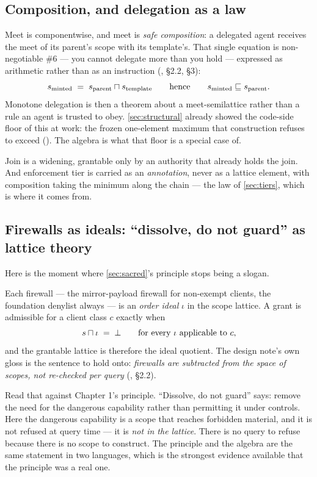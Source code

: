 \subsection*{Composition, and delegation as a law}

Meet is componentwise, and meet is \emph{safe composition}: a delegated agent
receives the meet of its parent's scope with its template's. That single equation is
non-negotiable \#6 --- you cannot delegate more than you hold --- expressed as
arithmetic rather than as an instruction
(, \S 2.2, \S 3):
\[
  s{}_{\text{minted}} \;=\; s{}_{\text{parent}} \sqcap{}
  s{}_{\text{template}}
  \qquad\text{hence}\qquad
  s{}_{\text{minted}} \sqsubseteq{} s{}_{\text{parent}}.
\]
Monotone delegation is then a theorem about a meet-semilattice rather than a rule
an agent is trusted to obey. \autoref{sec:structural} already showed the
code-side floor of this at work: the frozen one-element maximum that construction
refuses to exceed
().
The algebra is what that floor is a special case of.

Join is a widening, grantable only by an authority that already holds the join.
And enforcement tier is carried as an \emph{annotation}, never as a lattice
element, with composition taking the minimum along the chain --- the law of
\autoref{sec:tiers}, which is where it comes from.

\subsection*{Firewalls as ideals: ``dissolve, do not guard'' as lattice theory}

Here is the moment where \autoref{sec:sacred}'s principle stops being a slogan.

Each firewall --- the mirror-payload firewall for non-exempt clients, the
foundation denylist always --- is an \emph{order ideal} $\iota$ in the scope
lattice. A grant is admissible for a client class $c$ exactly when
\[
  s{} \sqcap{} \iota \;=\; \bot
  \qquad \text{for every } \iota \text{ applicable to } c ,
\]
and the grantable lattice is therefore the ideal quotient. The design note's own
gloss is the sentence to hold onto: \emph{firewalls are subtracted from the space
of scopes, not re-checked per query} (, \S 2.2).

Read that against Chapter 1's principle. ``Dissolve, do not guard'' says: remove
the need for the dangerous capability rather than permitting it under controls.
Here the dangerous capability is a scope that reaches forbidden material, and it is
not refused at query time --- it is \emph{not in the lattice}. There is no query to
refuse because there is no scope to construct. The principle and the algebra are
the same statement in two languages, which is the strongest evidence available that
the principle was a real one.

